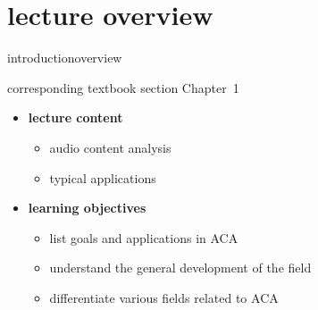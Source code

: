 


\subtitle{Module 1.0: Introduction to MIR/ACA}


	

    \section[overview]{lecture overview}
        \begin{frame}{introduction}{overview}
            \begin{block}{corresponding textbook section}
                    Chapter~1
            \end{block}
            \vspace{5mm}

            \begin{itemize}
                \item   \textbf{lecture content}
                    \begin{itemize}
                        \item   audio content analysis
                        \item   typical applications
                    \end{itemize}
                \bigskip
                \item<2->   \textbf{learning objectives}
                    \begin{itemize}
                        \item   list goals and applications in ACA
                        \item   understand the general development of the field
                        \item   differentiate various fields related to ACA
                    \end{itemize}
            \end{itemize}
        \end{frame}
        
